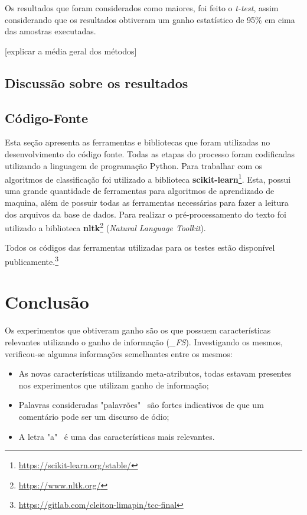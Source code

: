 Os resultados que foram considerados como maiores, foi feito o {\it t-test}, assim considerando que os resultados obtiveram um ganho estatístico de 95\% em cima das amostras executadas.


[explicar a média geral dos métodos]

\section{Discussão sobre os resultados}

\section{Código-Fonte}\label{sec:codigo-fonte}
Esta seção apresenta as ferramentas e bibliotecas que foram utilizadas no desenvolvimento do código fonte.
Todas as etapas do processo foram codificadas utilizando a linguagem de programação Python. Para trabalhar com os algoritmos de classificação foi utilizado a biblioteca {\bf scikit-learn}\footnote{\url{https://scikit-learn.org/stable/}}. Esta, possui uma grande quantidade de ferramentas para algoritmos de aprendizado de maquina, além de possuir todas as ferramentas necessárias para fazer a leitura dos arquivos da base de dados. Para realizar o pré-processamento do texto foi utilizado a biblioteca \textbf{nltk}\footnote{\url{https://www.nltk.org/}} ({\it Natural Language Toolkit}).

Todos os códigos das ferramentas utilizadas para os testes estão disponível publicamente.\footnote{\url{https://gitlab.com/cleiton-limapin/tcc-final}}

\chapter{Conclusão}\label{cap:conclusao}
Os experimentos que obtiveram ganho são os que possuem características relevantes utilizando o ganho de informação ({\it *\_FS}). Investigando os mesmos, verificou-se algumas informações semelhantes entre os mesmos: 

\begin{itemize}
    \item As novas características utilizando meta-atributos, todas estavam presentes nos experimentos que utilizam ganho de informação;
    \item Palavras consideradas "palavrões"~ são fortes indicativos de que um comentário pode ser um discurso de ódio;
    \item A letra "a"~ é uma das características mais relevantes.
\end{itemize}